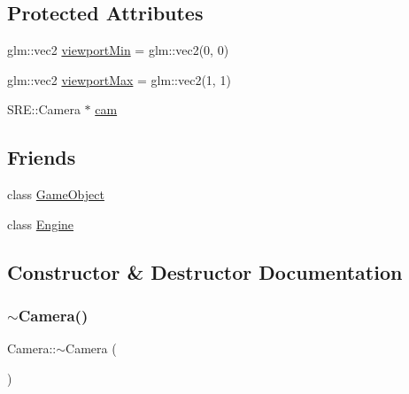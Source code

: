 \subsection*{Protected Attributes}
\begin{DoxyCompactItemize}
\item 
glm\+::vec2 \hyperlink{class_mason_1_1_camera_a87d7d4111e63ecb41bac7ea33ef270e1}{viewport\+Min} = glm\+::vec2(0, 0)
\item 
glm\+::vec2 \hyperlink{class_mason_1_1_camera_a8c7510e4c83e123aebbe7bb36da80de9}{viewport\+Max} = glm\+::vec2(1, 1)
\item 
S\+R\+E\+::\+Camera $\ast$ \hyperlink{class_mason_1_1_camera_a74f870fa866086c21f28f0a1f59254cc}{cam}
\end{DoxyCompactItemize}
\subsection*{Friends}
\begin{DoxyCompactItemize}
\item 
class \hyperlink{class_mason_1_1_camera_a00df87c957d8f7ee0fc51f07a0542f4a}{Game\+Object}
\item 
class \hyperlink{class_mason_1_1_camera_a3e1914489e4bed4f9f23cdeab34a43dc}{Engine}
\end{DoxyCompactItemize}


\subsection{Constructor \& Destructor Documentation}
\hypertarget{class_mason_1_1_camera_ad1897942d0ccf91052386388a497349f}{}\label{class_mason_1_1_camera_ad1897942d0ccf91052386388a497349f} 
\subsubsection{\texorpdfstring{$\sim$\+Camera()}{~Camera()}}
{\footnotesize\ttfamily Camera\+::$\sim$\+Camera (\begin{DoxyParamCaption}{ }\end{DoxyParamCaption})}

\hypertarget{class_mason_1_1_camera_aca4e1307d4601e7f0a711dfd94729143}{}\label{class_mason_1_1_camera_aca4e1307d4601e7f0a711dfd94729143} 
